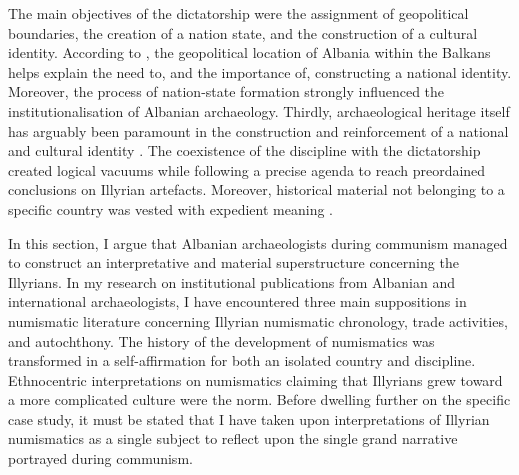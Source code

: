 	The main objectives of the dictatorship were the assignment of geopolitical boundaries, the creation of a nation state, and the construction of a cultural identity. According to \textcite[323]{Veseli2006}, the geopolitical location of Albania within the Balkans helps explain the need to, and the importance of, constructing a national identity. Moreover, the process of nation-state formation strongly influenced the institutionalisation of Albanian archaeology. Thirdly, archaeological heritage itself has arguably been paramount in the construction and reinforcement of a national and cultural identity \parencite{Veseli2006}. The coexistence of the discipline with the dictatorship created logical vacuums while following a precise agenda to reach preordained conclusions on Illyrian artefacts. Moreover, historical material not belonging to a specific country was vested with expedient meaning \parencite[225]{Kohl1998}.
	
	
	
	In this section, I argue that Albanian archaeologists during communism managed to construct an interpretative and material superstructure concerning the Illyrians. In my research on institutional publications from Albanian and international archaeologists, I have encountered three main suppositions in numismatic literature concerning Illyrian numismatic chronology, trade activities, and autochthony. The history of the development of numismatics was transformed in a self-affirmation for both an isolated country and discipline. Ethnocentric interpretations on numismatics claiming that Illyrians grew toward a more complicated culture were the norm. Before dwelling further on the specific case study, it must be stated that I have taken upon interpretations of Illyrian numismatics as a single subject to reflect upon the single grand narrative portrayed during communism.
	
	
